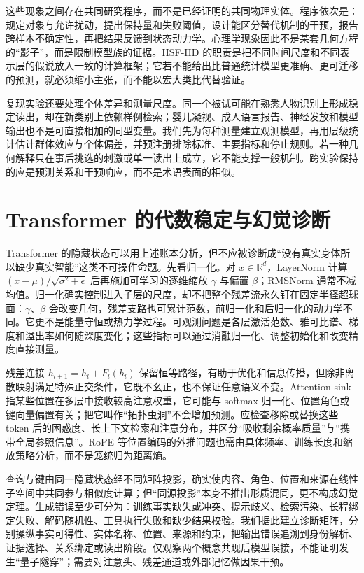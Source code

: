 这些现象之间存在共同研究程序，而不是已经证明的共同物理实体。程序依次是：规定对象与允许扰动，提出保持量和失败阈值，设计能区分替代机制的干预，报告跨样本不确定性，再把结果反馈到状态动力学。心理学现象因此不是某套几何方程的“影子”，而是限制模型族的证据。HSF-HD 的职责是把不同时间尺度和不同表示层的假说放入一致的计算框架；它若不能给出比普通统计模型更准确、更可迁移的预测，就必须缩小主张，而不能以宏大类比代替验证。

复现实验还要处理个体差异和测量尺度。同一个被试可能在熟悉人物识别上形成稳定读出，却在新类别上依赖样例检索；婴儿凝视、成人语言报告、神经发放和模型输出也不是可直接相加的同型变量。我们先为每种测量建立观测模型，再用层级统计估计群体效应与个体偏差，并预注册排除标准、主要指标和停止规则。若一种几何解释只在事后挑选的刺激或单一读出上成立，它不能支撑一般机制。跨实验保持的应是预测关系和干预响应，而不是术语表面的相似。

\section{Transformer 的代数稳定与幻觉诊断}
\label{sec:diagnosis_of_silicon_mimicry}

Transformer 的隐藏状态可以用上述账本分析，但不应被诊断成“没有真实身体所以缺少真实智能”这类不可操作命题。先看归一化。对 $x\in\mathbb{R}^{d}$，LayerNorm 计算 $(x-\mu)/\sqrt{\sigma^2+\epsilon}$ 后再施加可学习的逐维缩放 $\gamma$ 与偏置 $\beta$；RMSNorm 通常不减均值。归一化确实控制进入子层的尺度，却不把整个残差流永久钉在固定半径超球面：$\gamma$、$\beta$ 会改变几何，残差支路也可累计范数，前归一化和后归一化的动力学不同。它更不是能量守恒或热力学过程。可观测问题是各层激活范数、雅可比谱、梯度和溢出率如何随深度变化；这些指标可以通过消融归一化、调整初始化和改变精度直接测量。

残差连接 $h_{l+1}=h_l+F_l(h_l)$ 保留恒等路径，有助于优化和信息传播，但除非离散映射满足特殊正交条件，它既不幺正，也不保证任意语义不变。Attention sink 指某些位置在多层中接收较高注意权重，它可能与 softmax 归一化、位置角色或键向量偏置有关；把它叫作“拓扑虫洞”不会增加预测。应检查移除或替换这些 token 后的困惑度、长上下文检索和注意分布，并区分“吸收剩余概率质量”与“携带全局参照信息”。RoPE 等位置编码的外推问题也需由具体频率、训练长度和缩放策略分析，而不是笼统归为距离熵。

查询与键由同一隐藏状态经不同矩阵投影，确实使内容、角色、位置和来源在线性子空间中共同参与相似度计算；但“同源投影”本身不推出形质混同，更不构成幻觉定理。生成错误至少可分为：训练事实缺失或冲突、提示歧义、检索污染、长程绑定失败、解码随机性、工具执行失败和缺少结果校验。我们据此建立诊断矩阵，分别操纵事实可得性、实体名称、位置、来源和约束，把输出错误追溯到身份解析、证据选择、关系绑定或读出阶段。仅观察两个概念共现后模型误接，不能证明发生“量子隧穿”；需要对注意头、残差通道或外部记忆做因果干预。

